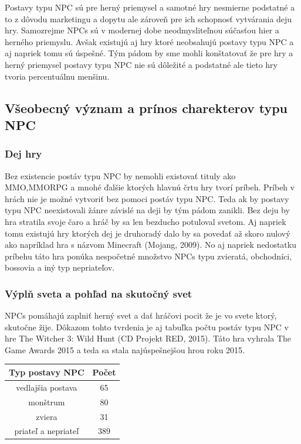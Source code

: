 \documentclass[10pt,twoside,slovak,a4paper]{article}
\begin{document}
Postavy typu NPC sú pre herný priemysel a samotné hry nesmierne podstatné a to z dôvodu marketingu a dopytu ale zároveň pre ich schopnosť vytvárania deju hry. Samozrejme NPCs sú v modernej dobe neodmysliteľnou súčasťou hier a herného priemyslu. Avšak existujú aj hry ktoré neobsahujú postavy typu NPC a aj napriek tomu sú úspešné. Tým pádom by sme mohli konštatovať že pre hry a herný priemysel postavy typu NPC nie sú dôležité a podstatné ale tieto hry tvoria percentuálnu menšinu.%

\subsection{Všeobecný význam a prínos charekterov typu NPC}

\subsubsection{Dej hry}
Bez existencie postáv typu NPC by nemohli existovať tituly ako MMO,MMORPG a mnohé ďalšie 
ktorých hlavnú črtu hry tvorí príbeh. Príbeh v hrách nie je možné vytvoriť bez pomoci postáv typu NPC. 
Teda ak by postavy typu NPC neexistovali žánre závislé na deji by tým pádom zanikli. 
Bez deju by hra stratila svoje čaro a hráč by sa len bezducho potuloval svetom. Aj napriek tomu 
existujú hry ktorých dej je druhoradý dalo by sa povedať až skoro nulový ako 
napríklad hra s názvom Minecraft (Mojang, 2009). No aj napriek nedostatku príbehu 
táto hra ponúka nespočetné množstvo NPCs typu zvieratá, obchodníci, bossovia a iný typ nepriateľov.

\subsubsection{Výplň sveta a pohľad na skutočný svet}
NPCs pomáhajú zaplniť herný svet a dať hráčovi pocit že je vo svete ktorý,
skutočne žije. Dôkazom tohto tvrdenia je aj tabuľka počtu postáv typu NPC v hre The Witcher 3: Wild Hunt (CD Projekt RED, 2015). Táto hra vyhrala The Game Awards 2015 a teda sa stala najúspešnejšou hrou roku 2015. 


\begin{center}

\hfill \break
    
\begin{tabular}{|c|c|}
    
     \hline
     Typ postavy NPC & Počet\\
     \hline
     vedlajšia postava & 65\\
    \hline
    monštrum & 80\\
    \hline
    zviera & 31\\
    \hline
    priateľ a nepriateľ &389\\
    \hline

\end{tabular}

\hfill \break

\end{center}
\end{document}

